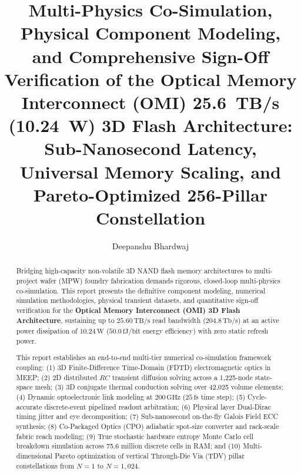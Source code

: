 \documentclass[journal]{IEEEtran}
\begin{document}
\title{Multi-Physics Co-Simulation, Physical Component Modeling, and Comprehensive Sign-Off Verification of the Optical Memory Interconnect (OMI) 25.6~TB/s (10.24~W) 3D Flash Architecture: Sub-Nanosecond Latency, Universal Memory Scaling, and Pareto-Optimized 256-Pillar Constellation}

\author{Deepanshu Bhardwaj}

\markboth{}{}%

\maketitle

\begin{abstract}
Bridging high-capacity non-volatile 3D NAND flash memory architectures to multi-project wafer (MPW) foundry fabrication demands rigorous, closed-loop multi-physics co-simulation. This report presents the definitive component modeling, numerical simulation methodologies, physical transient datasets, and quantitative sign-off verification for the \textbf{Optical Memory Interconnect (OMI) 3D Flash Architecture}, sustaining up to $25.60\,\text{TB/s}$ read bandwidth ($204.8\,\text{Tb/s}$) at an active power dissipation of $10.24\,\text{W}$ ($50.0\,\text{fJ/bit}$ energy efficiency) with zero static refresh power.

This report establishes an end-to-end multi-tier numerical co-simulation framework coupling: (1) 3D Finite-Difference Time-Domain (FDTD) electromagnetic optics in MEEP; (2) 2D distributed $RC$ transient diffusion solving across a 1,225-node state-space mesh; (3) 3D conjugate thermal conduction solving over 42,025 volume elements; (4) Dynamic optoelectronic link modeling at $200\,\text{GHz}$ ($25\,\text{fs}$ time step); (5) Cycle-accurate discrete-event pipelined readout arbitration; (6) Physical layer Dual-Dirac timing jitter and eye decomposition; (7) Sub-nanosecond on-the-fly Galois Field ECC synthesis; (8) Co-Packaged Optics (CPO) adiabatic spot-size converter and rack-scale fabric reach modeling; (9) True stochastic hardware entropy Monte Carlo cell breakdown simulation across 75.6 million discrete cells in RAM; and (10) Multi-dimensional Pareto optimization of vertical Through-Die Via (TDV) pillar constellations from $N=1$ to $N=1,024$.


\end{abstract}
\end{document}
